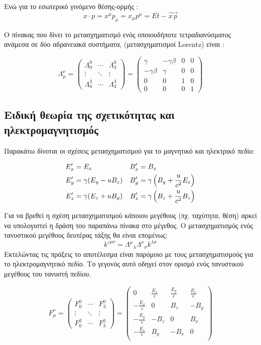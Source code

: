 Ενώ για το εσωτερικό γινόμενο θέσης-ορμής : 
\[
  x\cdot p= x^\mu p_\mu =x_\mu p^\mu= Et-\vec{x}\vec{p}
\]

Ο πίνακας που δίνει το  μετασχηματισμό ενός οποιουδήποτε τετραδιανύσματος ανάμεσα σε δύο αδρανειακά συστήματα, (μετασχηματισμοί \textlatin{Lorentz}) είναι : 

\begin{equation}
  \Lambda_\mu ^\nu=
  \begin{pmatrix}
    \Lambda^0 _0  & \cdots & \Lambda^0 _3 \\
    \vdots & \ddots & \vdots \\
    \Lambda^3 _0  & \cdots & \Lambda^3 _3
  \end{pmatrix}
  =
  \begin{pmatrix}
    \gamma & -\gamma \beta& 0 & 0 \\
    -\gamma \beta & \gamma & 0 & 0 \\
    0 & 0 & 1 & 0 \\
    0 & 0 & 0 & 1
  \end{pmatrix} 
\end{equation}

\subsection{Ειδική θεωρία της σχετικότητας και ηλεκτρομαγνητισμός }
Παρακάτω δίνοται οι σχέσεις μετασχηματισμού για το μαγνητικό και ηλεκτρικό πεδίο:

\begin{align*} 
  E'_x &= E_x        & B'_x &= B_x   
  \\E'_y &= \gamma(E_y-u B_z)         & B'_y &= \gamma \left(  B_y+\frac{u}{c^2}E_z \right)   
  \\E'_z &= \gamma(E_z+u B_y)        & B'_z &= \gamma \left(  B_z+\frac{u}{c^2}B_z \right)    
\end{align*} 

Για να βρεθεί η σχέση μετασχηματισμού κάποιου μεγέθους (πχ. ταχύτητα, θέση) αρκεί να υπολογιστεί η δράση του παραπάνω πίνακα στο μέγεθος. Ο μετασχηματισμός ενός τανυστικού μεγέθους δευτέρας τάξης θα είναι επομένως:
\[
k'^{\mu \nu}= {\Lambda^{\mu}}_{\lambda} {\Lambda^{\nu}}_{\sigma} k^{\lambda \sigma} 
\]
Εκτελώντας τις πράξεις το αποτέλεσμα είναι παρόμοιο με τους μετασχηματισμούς για το ηλεκτρομαγνητικό πεδίο. Το γεγονός αυτό οδηγεί στον ορισμό ενός τανυστικού μεγέθους του τανυστή πεδίου. 

\[
  F_\mu ^\nu=
  \begin{pmatrix}
    F^0 _0  & \cdots & F^0 _3 \\
    \vdots & \ddots & \vdots \\
    F^3 _0  & \cdots & F^3 _3
  \end{pmatrix}
  =
  \begin{pmatrix}
    0                &\frac{E_x}{c} &\frac{E_y}{c} & \frac{E_z}{c} \\
    -\frac{E_x}{c}   & 0            & B_z          & -B_y \\
    -\frac{E_y}{c}   & -B_z         & 0            & B_x \\
    -\frac{E_z}{c}   & B_y          & -B_x         & 0 \\
  \end{pmatrix} 
\]

